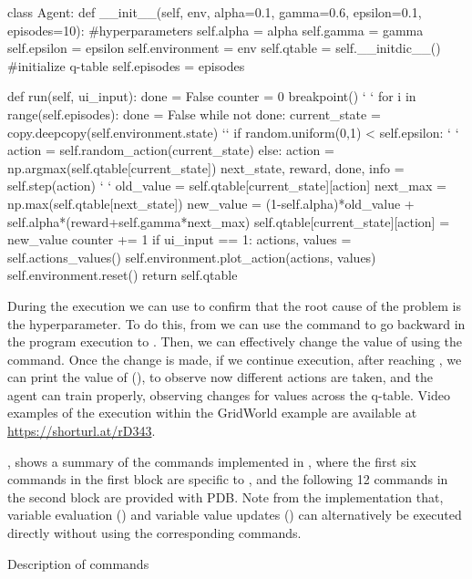 \begin{python}[numbers=left,
	caption={\flik running example of the GridWorld environment},
	label={lst:gridworld-learner}]
class Agent:
  def __init__(self, env, alpha=0.1, gamma=0.6, epsilon=0.1, episodes=10):
    #hyperparameters
    self.alpha = alpha
    self.gamma = gamma
    self.epsilon = epsilon
    self.environment = env
    self.qtable = self.__initdic__() #initialize q-table
    self.episodes = episodes
    
  def run(self, ui_input):
      done = False
      counter = 0
      breakpoint()  ` \label{ln:breakpoint} `
      for i in range(self.episodes):
        done = False
        while not done:
          current_state = copy.deepcopy(self.environment.state) `\label{ln:back1}`
          if random.uniform(0,1) < self.epsilon:   ` \label{ln:stop1} `
            action = self.random_action(current_state)
          else:
            action = np.argmax(self.qtable[current_state])  
          next_state, reward, done, info = self.step(action) ` \label{ln:stop2} `
          old_value = self.qtable[current_state][action]
          next_max = np.max(self.qtable[next_state])
          new_value = (1-self.alpha)*old_value + self.alpha*(reward+self.gamma*next_max)
          self.qtable[current_state][action] = new_value
          counter += 1
        if ui_input == 1:
          actions, values = self.actions_values()
          self.environment.plot_action(actions, values)
        self.environment.reset()
    return self.qtable
\end{python}

During the execution we can use \flik to confirm that the root cause of the problem is the  
hyperparameter. To do this, from  we can use the command  to go 
backward in the program execution to . Then, we can effectively change the value of 
 using the  command. Once the change is made, if we 
continue execution, after reaching , we can print the value of  (), 
to observe now different actions are taken, and the agent can train properly, observing changes for 
values across the q-table. Video examples of the \flik execution within the GridWorld example are 
available at \url{https://shorturl.at/rD343}.

, shows a summary of the commands implemented in \flik, where the 
first six commands in the first block are specific to \flik, and the following 12 commands in the second 
block are provided with \ac{PDB}. Note from the implementation that, variable evaluation () and 
variable value updates () can alternatively be executed directly without using the 
corresponding commands.

\begin{table}
  \centering
  \caption{Description of \flik commands}
  
  \label{tab:flik-commands}
\end{table}


\endinput

video \url{https://drive.google.com/file/d/1NyipuWsRr6ZrIbtlvU5qyooHS2aVsWXc/view?usp=sharing}.